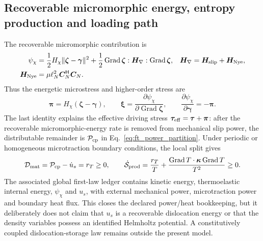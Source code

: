 \subsection{Recoverable micromorphic energy, entropy production and loading path}

The recoverable micromorphic contribution is
\begin{align}
 \psi_\chi
 &=\frac12H_\chi\|\boldsymbol\zeta-\boldsymbol\gamma\|^2
 +\frac12\operatorname{Grad}\boldsymbol\zeta:
 \boldsymbol H_\nabla:\operatorname{Grad}\boldsymbol\zeta,
 &\boldsymbol H_\nabla&=\boldsymbol H_{\rm slip}+\boldsymbol H_{\rm Nye},\\
 \boldsymbol H_{\rm Nye}&=\mu\ell_N^2
 \boldsymbol C_N^{\mathsf H}\boldsymbol C_N .
 \label{eq:dyn_gradient_energy}
\end{align}
Thus the energetic microstress and higher-order stress are
\begin{equation}
 \boldsymbol\pi=H_\chi(\boldsymbol\zeta-\boldsymbol\gamma),
 \qquad
 \boldsymbol\xi=\frac{\partial\psi_\chi}
 {\partial\operatorname{Grad}\boldsymbol\zeta},
 \qquad
 \frac{\partial\psi_\chi}{\partial\boldsymbol\gamma}=-\boldsymbol\pi .
 \label{eq:ft_energetic_microstresses}
\end{equation}
The last identity explains the effective driving stress
$\boldsymbol\tau_{\rm eff}=\boldsymbol\tau+\boldsymbol\pi$: after the
recoverable micromorphic-energy rate is removed from mechanical slip power,
the distributable remainder is $\mathcal P_{\rm cp}$ in
Eq.~\eqref{eq:ft_power_partition}. Under periodic or homogeneous
microtraction boundary conditions, the local split gives
\begin{equation}
 \mathcal D_{\rm mat}=\mathcal P_{\rm cp}-\dot u_s
 =r_T\ge0,
 \qquad
 \dot{\mathcal S}_{\rm prod}
 =\frac{r_T}{T}
 +\frac{\operatorname{Grad}T\cdot\boldsymbol\kappa
 \operatorname{Grad}T}{T^2}\ge0 .
 \label{eq:ft_entropy_production}
\end{equation}
The associated global first-law ledger contains kinetic energy, thermoelastic
internal energy, $\psi_\chi$ and $u_s$, with external mechanical power,
microtraction power and boundary heat flux. This closes the declared
power/heat bookkeeping, but it deliberately does not claim that $u_s$ is a
recoverable dislocation energy or that the density variables possess an
identified Helmholtz potential. A constitutively coupled dislocation-storage
law remains outside the present model.

